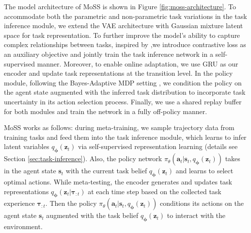 \documentclass[letterpaper]{article} %
\begin{document}
The model architecture of MoSS is shown in Figure \ref{fig:moss-architecture}. To accommodate both the parametric and non-parametric task variations in the task inference module, we extend the VAE architecture with Gaussian mixture latent space for task representation. To further improve the model's ability to capture complex relationships between tasks, inspired by \cite{MCAT, Contrastive-2},we introduce contrastive loss as an auxiliary objective and jointly train the task inference network in a self-supervised manner. Moreover, to enable online adaptation, we use GRU \cite{GRU} as our encoder and update task representations at the transition level. In the policy module, following the Bayes-Adaptive MDP setting \cite{BAMDP, BayesianRL, VariBAD}, we condition the policy on the agent state augmented with the inferred task distribution to incorporate task uncertainty in its action selection process. Finally, we use a shared replay buffer for both modules and train the network in a fully off-policy manner.


MoSS works as follows: during meta-training, we sample trajectory data from training tasks and feed them into the task inference module, which learns to infer latent variables $q_{\bm \phi}(\bm z_{t})$ via self-supervised representation learning (details see Section \ref{sec:task-inference}). Also, the policy network $\pi_{\theta}(\bm a_{t}|\bm s_{t}, q_{\bm \phi}(\bm z_{t}))$ takes in the agent state $\bm s_{t}$ with the current task belief $q_{\bm \phi}(\bm z_{t})$ and learns to select optimal actions. While meta-testing, the encoder generates and updates task representations $q_{\bm \phi}(\bm z_{t}|\bm \tau_{:t})$ at each time step based on the collected task experience $\bm \tau_{:t}$. Then the policy $\pi_{\theta}(\bm a_{t}|\bm s_{t}, q_{\bm \phi}(\bm z_{t}))$ conditions its actions on the agent state $\bm s_{t}$ augmented with the task belief $q_{\bm \phi}(\bm z_{t})$ to interact with the environment.

\end{document}
